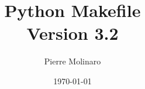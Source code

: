 \documentclass[a4paper,11pt]{extarticle}
\begin{document}
 


\title{\bf \Huge{Python Makefile\\Version 3.2}}
\author{Pierre Molinaro}
\date {\today}

\maketitle


\tableofcontents

\end{document}
